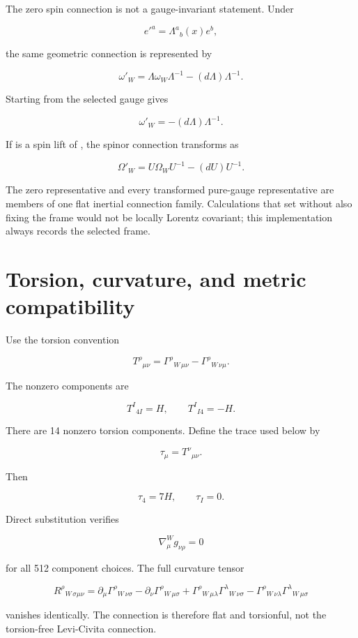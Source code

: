 \documentclass[11pt]{article}
\begin{document}
The zero spin connection is not a gauge-invariant statement. Under

\[
e'^a=\Lambda^a{}_b(x)e^b,
\]

the same geometric connection is represented by

\[
\omega'_W
=\Lambda\omega_W\Lambda^{-1}
-(d\Lambda)\Lambda^{-1}.
\]

Starting from the selected gauge gives

\[
\omega'_W=-(d\Lambda)\Lambda^{-1}.
\]

If \texttt{} is a spin lift of \texttt{}, the spinor connection transforms as

\[
\Omega'_W
=U\Omega_WU^{-1}-(dU)U^{-1}.
\]

The zero representative and every transformed pure-gauge representative are members of one flat inertial connection family. Calculations that set \texttt{} without also fixing the frame would not be locally Lorentz covariant; this implementation always records the selected frame.

\section{Torsion, curvature, and metric compatibility}

Use the torsion convention

\[
T^\rho{}_{\mu\nu}
=\Gamma^\rho{}_{W\,\mu\nu}
-\Gamma^\rho{}_{W\,\nu\mu}.
\]

The nonzero components are

\[
T^I{}_{4I}=H,
\qquad
T^I{}_{I4}=-H.
\]

There are 14 nonzero torsion components. Define the trace used below by

\[
\tau_\mu=T^\nu{}_{\mu\nu}.
\]

Then

\[
\boxed{\tau_4=7H,\qquad \tau_I=0.}
\]

Direct substitution verifies

\[
\nabla^W_\mu g_{\nu\rho}=0
\]

for all 512 component choices. The full curvature tensor

\[
R^\rho{}_{W\,\sigma\mu\nu}
=\partial_\mu\Gamma^\rho{}_{W\,\nu\sigma}
-\partial_\nu\Gamma^\rho{}_{W\,\mu\sigma}
+\Gamma^\rho{}_{W\,\mu\lambda}
 \Gamma^\lambda{}_{W\,\nu\sigma}
-\Gamma^\rho{}_{W\,\nu\lambda}
 \Gamma^\lambda{}_{W\,\mu\sigma}
\]

vanishes identically. The connection is therefore flat and torsionful, not the torsion-free Levi-Civita connection.
\end{document}
